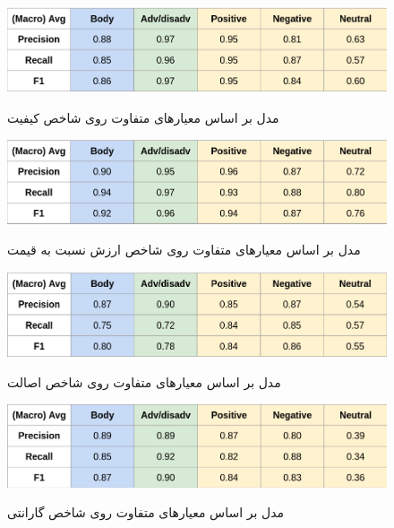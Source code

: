 
\begin{figure}[H]
\centering
\caption{ ‌مدل بر اساس معیارهای متفاوت روی شاخص کیفیت}\label{}
\includegraphics[width=15cm]{figs/quality.png}
\label{fig:test}
\end{figure}


\begin{figure}[H]
\centering
\caption{ ‌مدل بر اساس معیارهای متفاوت روی شاخص ارزش نسبت به قیمت}\label{}
\includegraphics[width=15cm]{figs/price.png}
\label{fig:test}
\end{figure}



\begin{figure}[H]
\centering
\caption{ ‌مدل بر اساس معیارهای متفاوت روی شاخص اصالت}\label{}
\includegraphics[width=15cm]{figs/fake.png}
\label{fig:test}
\end{figure}




\begin{figure}[H]
\centering
\caption{ ‌مدل بر اساس معیارهای متفاوت روی شاخص گارانتی}\label{}
\includegraphics[width=15cm]{figs/warranty.png}
\label{fig:test}
\end{figure}


